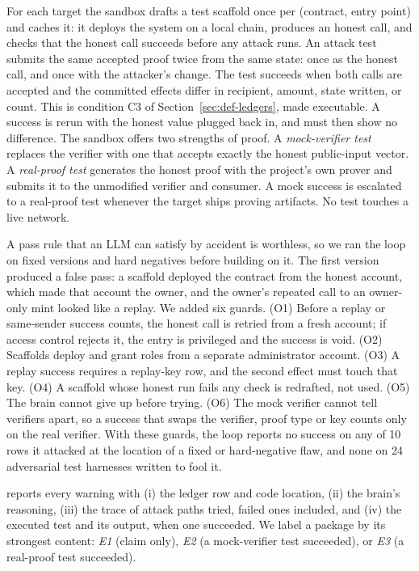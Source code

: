 For each target the sandbox drafts a test scaffold once per (contract, entry
point) and caches it: it deploys the system on a local chain, produces an
honest call, and checks that the honest call succeeds before any attack runs.
An attack test submits the same accepted proof twice from the same state:
once as the honest call, and once with the attacker's change. The test
succeeds when both calls are accepted and the committed effects differ in
recipient, amount, state written, or count. This is condition C3 of
Section~\ref{sec:def-ledgers}, made executable. A success is rerun with the
honest value plugged back in, and must then show no difference. The sandbox
offers two strengths of proof. A \emph{mock-verifier test} replaces the
verifier with one that accepts exactly the honest public-input vector. A
\emph{real-proof test} generates the honest proof with the project's own
prover and submits it to the unmodified verifier and consumer. A mock success
is escalated to a real-proof test whenever the target ships proving
artifacts. No test touches a live network.

A pass rule that an LLM can satisfy by accident is worthless, so we ran the
loop on fixed versions and hard negatives before building on it. The first
version produced a false pass: a scaffold deployed the contract from the
honest account, which made that account the owner, and the owner's repeated
call to an owner-only mint looked like a replay. We added six guards. (O1)
Before a replay or same-sender success counts, the honest call is retried
from a fresh account; if access control rejects it, the entry is privileged
and the success is void. (O2) Scaffolds deploy and grant roles from a
separate administrator account. (O3) A replay success requires a replay-key
row, and the second effect must touch that key. (O4) A scaffold whose honest
run fails any check is redrafted, not used. (O5) The brain cannot give up
before trying. (O6) The mock verifier cannot tell verifiers apart, so a
success that swaps the verifier, proof type or key counts only on the real
verifier. With these guards, the loop reports no success on any of 10 rows
it attacked at the location of a fixed or hard-negative flaw, and none on 24
adversarial test harnesses written to fool it.

\tool{} reports every warning with (i) the ledger row and code location,
(ii) the brain's reasoning, (iii) the trace of attack paths tried, failed
ones included, and (iv) the executed test and its output, when one succeeded.
We label a package by its strongest content: \emph{E1} (claim only),
\emph{E2} (a mock-verifier test succeeded), or \emph{E3} (a real-proof test
succeeded).

